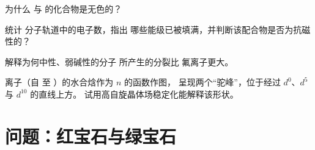 \begin{exercise}[$\star\star$]\label{exo:b2:ligand-field:9}
为什么  与  的化合物是无色的？
\end{exercise}

\begin{exercise}[$\star\star\star$]\label{exo:b2:ligand-field:10}
统计  分子轨道中的电子数，指出
哪些能级已被填满，并判断该配合物是否为抗磁性的？
\end{exercise}

\begin{exercise}[$\star\star\star$]\label{exo:b2:ligand-field:11}
解释为何中性、弱碱性的分子  所产生的分裂比
氟离子更大。
\end{exercise}

\begin{exercise}[$\star\star\star$]\label{exo:b2:ligand-field:12}
 离子（自  至 ）的水合焓作为 $n$ 的函数作图，
呈现两个“驼峰”，位于经过 $d^0$、$d^5$ 与 $d^{10}$ 的直线上方。
试用高自旋晶体场稳定化能解释该形状。
\end{exercise}

\section{问题：红宝石与绿宝石}

